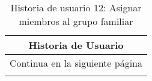 

\begin{longtable}{|p{6.7cm}|p{6.7cm}|}
    \caption{Historia de usuario 12: Asignar miembros al grupo familiar} \label{tab:historia-12}
    \\
    \hline
    \multicolumn{2}{|c|}{\textbf{Historia de Usuario}}                                                                                               \\
    \hline

    \endfirsthead

    \hline
    \endhead

    \hline
    \multicolumn{2}{|c|}{{Continua en la siguiente página}}                                                                                          \\
    \hline
    \endfoot

    \hline
    \endlastfoot


\end{longtable}
